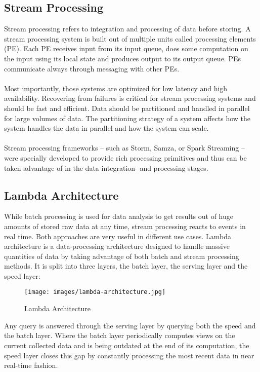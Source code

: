 \subsection{Stream Processing}
\label{intro-datastream-streamprocessing}
Stream processing refers to integration and processing of data before storing. 
A stream processing system is built out of multiple units called processing
elements (PE). Each PE receives input from its input queue, does some
computation on the input using its local state and produces output to its
output queue. PEs communicate always through messaging with other PEs. 
\\ \\
Most importantly, those systems are optimized for low latency and high
availability. Recovering from failures is critical for stream processing
systems and should be fast and efficient. 
Data should be partitioned and handled in parallel for large volumes of data. 
The partitioning strategy of a system  affects how the system
handles the data in parallel and how the system can scale. 
\cite{PrpSvyOfDSPS}
\\ \\
Stream processing frameworks -- such as Storm, Samza, or Spark
Streaming -- were specially developed to provide rich processing primitives and
thus can be taken advantage of in the data integration- and processing stages.

\subsection{Lambda Architecture}
While batch processing is used for data analysis to get results out of huge
amounts of stored raw data at any time, stream processing reacts to events in
real time. Both approaches are very useful in different use cases. Lambda
architecture is a data-processing architecture designed to handle massive
quantities of data by taking advantage of both batch and stream processing
methods. It is split into three layers, the batch layer, the serving layer and
the speed layer:

\begin{figure}[H]
    \centering
    \texttt{[image: images/lambda-architecture.jpg]}
    \caption{Lambda Architecture \cite{lambda-architecture}}
    \label{fig:lambda-Architecture}
\end{figure}

Any query is answered through the serving layer by querying both the speed and
the batch layer. Where the batch layer periodically computes views on the
current collected data and is being outdated at the end of its computation, the
speed layer closes this gap by constantly processing the most recent data in
near real-time fashion. \cite{marz2015big} \cite{PrpSvyOfDSPS}

